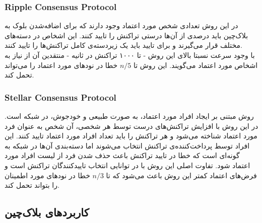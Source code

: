 \subsubsection{Ripple Consensus Protocol}
در این روش
\cite{ripple} \cite{ripple2}
 تعدادی شخص مورد اعتماد وجود دارند که برای اضافه‌شدن بلوک به بلاک‌چین باید درصدی از آن‌ها درستی تراکنش را تایید کنند. این اشخاص در دسته‌های مختلف قرار می‌گیرند و برای تایید باید یک زیردسته‌ی کامل تراکنش‌ها را تایید کنند.
 \\
 با وجود سرعت نسبتا بالای این روش - تا ۱۰۰۰ تراکنش در ثانیه - منتقدین آن از نیاز به اشخاص مورد اعتماد می‌گویند. این روش تا $ n /5 $ خطا در نود‌های مورد اعتماد را می‌تواند تحمل کند.


\subsubsection{Stellar Consensus Protocol}
 روش 
\cite{scp}
 مبتنی بر ایجاد افراد مورد اعتماد، به صورت طبیعی و خودجوش، در شبکه است. در این روش با افزایش تراکنش‌های درست توسط هر شخصی، آن شخص به عنوان فرد مورد اعتماد شناخته می‌شود و هر تراکنش را باید تعداد افراد مورد اعتماد تایید کنند. این افراد توسط پرداخت‌کننده‌ی تراکنش انتخاب می‌شوند اما دسته‌بندی آن‌ها در شبکه‌ به گونه‌ای است که خطا در تایید تراکنش باعث حذف شدن فرد از لیست افراد مورد اعتماد شود. تفاوت اصلی این روش با 
 در توانایی انتخاب تاییدکنندگان تراکنش است و فرض‌های اعتماد کمتر این روش باعث می‌شود که تا $ n /3 $ خطا در نود‌های مورد اطمینان را بتواند تحمل کند.



\subsection{کاربرد‌های بلاک‌چین}
